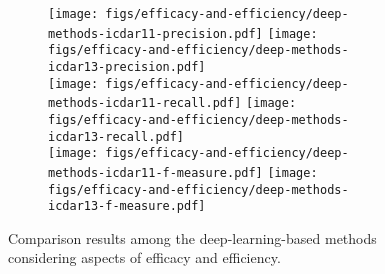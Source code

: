 \begin{figure}[H]
    \centering
    \begin{subfigure}[t]{0.98\textwidth}
        \centering
        \texttt{[image: figs/efficacy-and-efficiency/deep-methods-icdar11-precision.pdf]}
        \texttt{[image: figs/efficacy-and-efficiency/deep-methods-icdar13-precision.pdf]} \\
        \texttt{[image: figs/efficacy-and-efficiency/deep-methods-icdar11-recall.pdf]}
        \texttt{[image: figs/efficacy-and-efficiency/deep-methods-icdar13-recall.pdf]} \\
        \texttt{[image: figs/efficacy-and-efficiency/deep-methods-icdar11-f-measure.pdf]}
        \texttt{[image: figs/efficacy-and-efficiency/deep-methods-icdar13-f-measure.pdf]}
    \end{subfigure}
    \caption{Comparison results among the deep-learning-based methods considering aspects of efficacy and efficiency.}
    \label{fig:deep-methods-efficacy-and-efficiency}
\end{figure}


